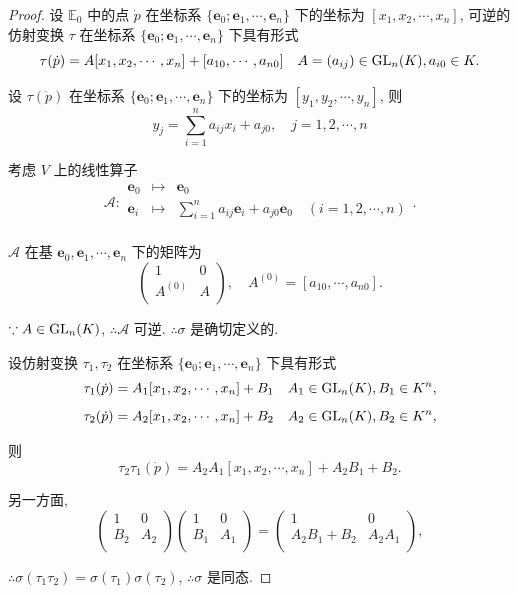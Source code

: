 \documentclass[color=black,device=normal,lang=cn,mode=geye]{elegantnote}
\begin{document}
\begin{proof}
    设 $\mathbb{E}_0$ 中的点 $\dot{p}$ 在坐标系 $\{\boldsymbol{e}_0;\boldsymbol{e}_1,\cdots,\boldsymbol{e}_n\}$ 下的坐标为 $[x_1,x_2,\cdots,x_n]$, 可逆的仿射变换 $\tau$ 在坐标系 $\{\boldsymbol{e}_0;\boldsymbol{e}_1,\cdots,\boldsymbol{e}_n\}$ 下具有形式
    \[\tau(\dot{p})=A[x_1,x_2,\cdots,x_n]+[a_{10},\cdots,a_{n0}]\quad A=(a_{ij})\in\operatorname{GL} _n(K),a_{i0}\in K.\]

    设 $\tau(\dot{p})$ 在坐标系 $\{\boldsymbol{e}_0;\boldsymbol{e}_1,\cdots,\boldsymbol{e}_n\}$ 下的坐标为 $[y_1,y_2,\cdots,y_n]$, 则
    \[y_j=\sum\limits_{i=1}^na_{ij}x_i+a_{j0},\quad j=1,2,\cdots,n\]

    考虑 $V$ 上的线性算子
    \[\mathcal{A}:\begin{array}{rcl}
        \boldsymbol{e}_0 & \mapsto & \boldsymbol{e}_0 \\
        \boldsymbol{e}_i & \mapsto & \sum\limits_{i=1}^na_{ij}\boldsymbol{e}_i+a_{j0}\boldsymbol{e}_0\quad(i=1,2,\cdots,n) \\
    \end{array}.\]

    $\mathcal{A}$ 在基 $\boldsymbol{e}_0,\boldsymbol{e}_1,\cdots,\boldsymbol{e}_n$ 下的矩阵为
    \[\begin{pmatrix}
        1 & 0 \\
        A^{(0)} & A \\
    \end{pmatrix},\quad A^{(0)}=[a_{10},\cdots,a_{n0}].\]

    $\because A\in\operatorname{GL} _n(K)$, $\therefore\mathcal{A}$ 可逆. $\therefore\sigma$ 是确切定义的.

    设仿射变换 $\tau_1,\tau_2$ 在坐标系 $\{\boldsymbol{e}_0;\boldsymbol{e}_1,\cdots,\boldsymbol{e}_n\}$ 下具有形式
    \[\tau_1(\dot{p})=A_1[x_1,x_2,\cdots,x_n]+B_1\quad A_1\in\operatorname{GL} _n(K),B_1\in K^n,\]
    \[\tau_2(\dot{p})=A_2[x_1,x_2,\cdots,x_n]+B_2\quad A_2\in\operatorname{GL} _n(K),B_2\in K^n,\]

    则
    \[\tau_2\tau_1(\dot{p})=A_2A_1[x_1,x_2,\cdots,x_n]+A_2B_1+B_2.\]

    另一方面,
    \[\begin{pmatrix}
        1 & 0 \\
        B_2 & A_2 \\
    \end{pmatrix}\begin{pmatrix}
        1 & 0 \\
        B_1 & A_1 \\
    \end{pmatrix}=\begin{pmatrix}
        1 & 0 \\
        A_2B_1+B_2 & A_2A_1 \\
    \end{pmatrix},\]

    $\therefore\sigma(\tau_1\tau_2)=\sigma(\tau_1)\sigma(\tau_2)$, $\therefore\sigma$ 是同态.
\end{proof}
\end{document}

